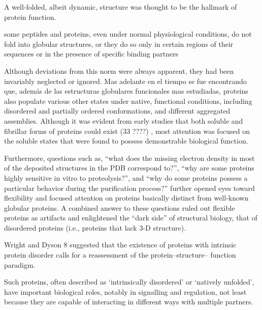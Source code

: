 A well-folded, albeit dynamic,
structure was thought to be the hallmark of protein function.











some peptides and proteins, even under normal physiological conditions, do not fold into globular structures,
or they do so only in certain regions of their sequences or in the presence of specific binding partners

Although deviations from this norm were always apparent, they had been invariably neglected or ignored.
Mas adelante en el tiempo se fue encontrando que, además de las estructuras globulares funcionales mas estudiadas, proteins also populate various other states under native, functional conditions, including disordered and partially ordered conformations, and different aggregated assemblies.
Although it was evident from early studies that both soluble and fibrillar forms of proteins could exist (33 ????) , most attention was focused on the soluble states that were found to possess demonstrable biological function.


Furthermore, questions such as, “what does the missing
electron density in most of the deposited structures in the PDB
correspond to?”, “why are some proteins highly sensitive in vitro
to proteolysis?”, and “why do some proteins possess a particular
behavior during the purification process?” further opened eyes
toward flexibility and focused attention on proteins basically
distinct from well-known globular proteins. A combined answer
to these questions ruled out flexible proteins as artifacts and
enlightened the “dark side” of structural biology, that of
disordered proteins (i.e., proteins that lack 3-D structure).

Wright and Dyson 8 suggested that the existence of proteins with intrinsic protein disorder calls for a reassessment of the protein–structure– function paradigm.

Such proteins, often described as ‘intrinsically disordered’ or ‘natively unfolded’, have important biological roles, notably in signalling and regulation, not least
because they are capable of interacting in different ways with multiple partners. %


